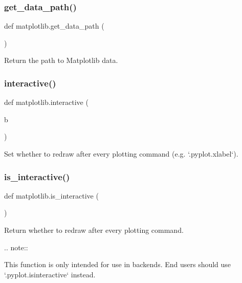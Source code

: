 \subsubsection{\texorpdfstring{get\+\_\+data\+\_\+path()}{get\_data\_path()}}
{\footnotesize\ttfamily def matplotlib.\+get\+\_\+data\+\_\+path (\begin{DoxyParamCaption}{ }\end{DoxyParamCaption})}

\begin{DoxyVerb}Return the path to Matplotlib data.\end{DoxyVerb}
 \mbox{\label{namespacematplotlib_aa54ae7131f356c434ad340da03b7daa2}} 
\subsubsection{\texorpdfstring{interactive()}{interactive()}}
{\footnotesize\ttfamily def matplotlib.\+interactive (\begin{DoxyParamCaption}\item[{}]{b }\end{DoxyParamCaption})}

\begin{DoxyVerb}Set whether to redraw after every plotting command (e.g. `.pyplot.xlabel`).
\end{DoxyVerb}
 \mbox{\label{namespacematplotlib_a565795d222b6e75d08b543fc1b5cda27}} 
\subsubsection{\texorpdfstring{is\+\_\+interactive()}{is\_interactive()}}
{\footnotesize\ttfamily def matplotlib.\+is\+\_\+interactive (\begin{DoxyParamCaption}{ }\end{DoxyParamCaption})}

\begin{DoxyVerb}Return whether to redraw after every plotting command.

.. note::

    This function is only intended for use in backends. End users should
    use `.pyplot.isinteractive` instead.
\end{DoxyVerb}
 \mbox{\label{namespacematplotlib_a617194912be38b02290e2ede1d18edf5}} 

